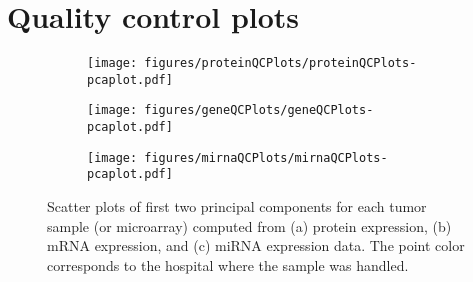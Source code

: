 


\section{Quality control plots\label{app:qc-plots}}


\begin{figure}[!h]
	\centering
	\begin{subfigure}{.7\textwidth}
		\centering
		\texttt{[image: figures/proteinQCPlots/proteinQCPlots-pcaplot.pdf]}
	\end{subfigure}
	\begin{subfigure}{.48\textwidth}
		\centering
		\texttt{[image: figures/geneQCPlots/geneQCPlots-pcaplot.pdf]}
	\end{subfigure}
	\begin{subfigure}{.48\textwidth}
		\centering
		\texttt{[image: figures/mirnaQCPlots/mirnaQCPlots-pcaplot.pdf]}
	\end{subfigure}

	\caption{Scatter plots of first two principal components for each tumor sample (or microarray)
	computed from (a) protein expression, (b) mRNA expression, and (c) miRNA expression data.
	The point color corresponds to the hospital where the sample was handled.}
	\label{fig:qc-pca}
\end{figure}


